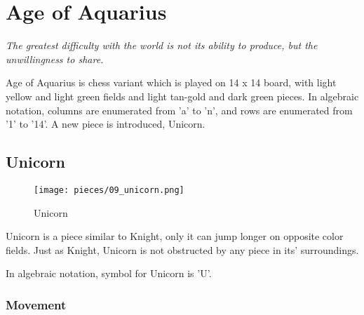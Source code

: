 

\chapter*{Age of Aquarius}

\begin{flushright}
\parbox{0.8\textwidth}{
\emph{The greatest difficulty with the world is not its ability to produce, but the unwillingness to share. \\
 } }
\end{flushright}

\noindent
Age of Aquarius is chess variant which is played on 14 x 14 board,
with light yellow and light green fields and light tan-gold and
dark green pieces. In algebraic notation, columns are enumerated
from 'a' to 'n', and rows are enumerated from '1' to '14'. A new
piece is introduced, Unicorn.

\clearpage %

\section*{Unicorn}

\noindent
\begin{wrapfigure}[7]{l}{0.4\textwidth}
\centering
\texttt{[image: pieces/09\_unicorn.png]}
\caption{Unicorn}
\label{fig:09_unicorn}
\end{wrapfigure}
Unicorn is a piece similar to Knight, only it can jump longer on
opposite color fields. Just as Knight, Unicorn is not obstructed
by any piece in its' surroundings.

In algebraic notation, symbol for Unicorn is 'U'.

\vspace{4\baselineskip}
\subsection*{Movement}
\label{sec:Age of Aquarius/Unicorn/Movement}

